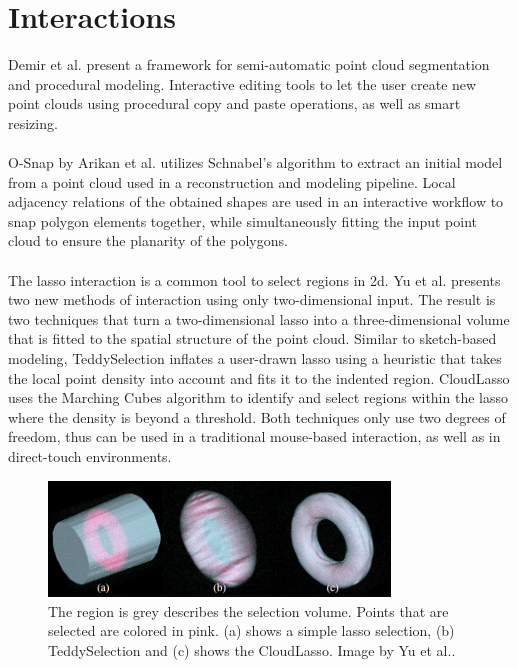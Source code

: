 \section {Interactions}


Demir et al.\cite{demir2015procedural} present a framework for semi-automatic point cloud segmentation and procedural modeling. Interactive editing tools to let the user create new point clouds using procedural copy and paste operations, as well as smart resizing. 
\\
\\
O-Snap by Arikan et al. \cite{arikan-2013-osn} utilizes Schnabel's algorithm to extract an initial model from a point cloud used in a reconstruction and modeling pipeline. Local adjacency relations of the obtained shapes are used in an interactive workflow to snap polygon elements together, while simultaneously fitting the input point cloud to ensure the planarity of the polygons. 
\\
\\
The lasso interaction is a common tool to select regions in 2d. Yu et al.\cite{yu2012efficient} presents two new methods of interaction using only two-dimensional input. The result is two techniques that turn a two-dimensional lasso into a three-dimensional volume that is fitted to the spatial structure of the point cloud. Similar to sketch-based modeling\cite{igarashi2007teddy}, TeddySelection inflates a user-drawn lasso using a heuristic that takes the local point density into account and fits it to the indented region. CloudLasso uses the Marching Cubes algorithm\cite{lorensen1987marching} to identify and select regions within the lasso where the density is beyond a threshold. Both techniques only use two degrees of freedom, thus can be used in a traditional mouse-based interaction, as well as in direct-touch environments. 

\begin{figure}
    \centering
    \includegraphics[width=0.81\textwidth]{Related_Work/teddyCloudSelection.png}%
    \caption{The region is grey describes the selection volume. Points that are selected are colored in pink. (a) shows a simple lasso selection, (b) TeddySelection and (c) shows the CloudLasso. Image by Yu et al.\cite{yu2012efficient}.}
    \label{fig:teddyCloudSelection}
\end{figure}

